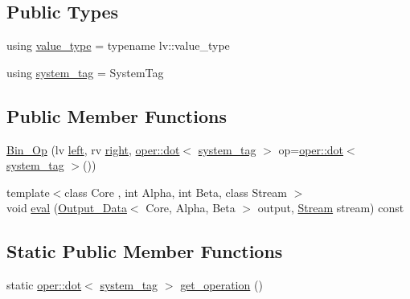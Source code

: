 \subsection*{Public Types}
\begin{DoxyCompactItemize}
\item 
using \hyperlink{structbc_1_1tensors_1_1exprs_1_1Bin__Op_3_01oper_1_1dot_3_01SystemTag_01_4_00_01lv_00_01rv_01_4_a6e196b34e6c3c318929830ed01156927}{value\+\_\+type} = typename lv\+::value\+\_\+type
\item 
using \hyperlink{structbc_1_1tensors_1_1exprs_1_1Bin__Op_3_01oper_1_1dot_3_01SystemTag_01_4_00_01lv_00_01rv_01_4_aac42309fcd782d98f3d908ce98defba8}{system\+\_\+tag} = System\+Tag
\end{DoxyCompactItemize}
\subsection*{Public Member Functions}
\begin{DoxyCompactItemize}
\item 
\hyperlink{structbc_1_1tensors_1_1exprs_1_1Bin__Op_3_01oper_1_1dot_3_01SystemTag_01_4_00_01lv_00_01rv_01_4_a9078278be7946d741f995f564ef3885e}{Bin\+\_\+\+Op} (lv \hyperlink{structbc_1_1tensors_1_1exprs_1_1Bin__Op_3_01oper_1_1dot_3_01SystemTag_01_4_00_01lv_00_01rv_01_4_a1a5f4155953dd6833d49faf2ca2d0b38}{left}, rv \hyperlink{structbc_1_1tensors_1_1exprs_1_1Bin__Op_3_01oper_1_1dot_3_01SystemTag_01_4_00_01lv_00_01rv_01_4_a9aca1e09b777dd5ca1edbbc27f59f01d}{right}, \hyperlink{structbc_1_1oper_1_1dot}{oper\+::dot}$<$ \hyperlink{structbc_1_1tensors_1_1exprs_1_1Bin__Op_3_01oper_1_1dot_3_01SystemTag_01_4_00_01lv_00_01rv_01_4_aac42309fcd782d98f3d908ce98defba8}{system\+\_\+tag} $>$ op=\hyperlink{structbc_1_1oper_1_1dot}{oper\+::dot}$<$ \hyperlink{structbc_1_1tensors_1_1exprs_1_1Bin__Op_3_01oper_1_1dot_3_01SystemTag_01_4_00_01lv_00_01rv_01_4_aac42309fcd782d98f3d908ce98defba8}{system\+\_\+tag} $>$())
\item 
{\footnotesize template$<$class Core , int Alpha, int Beta, class Stream $>$ }\\void \hyperlink{structbc_1_1tensors_1_1exprs_1_1Bin__Op_3_01oper_1_1dot_3_01SystemTag_01_4_00_01lv_00_01rv_01_4_afbee15d8347800bab6db511df9ea245b}{eval} (\hyperlink{structbc_1_1tensors_1_1exprs_1_1Output__Data}{Output\+\_\+\+Data}$<$ Core, Alpha, Beta $>$ output, \hyperlink{classbc_1_1streams_1_1Stream}{Stream} stream) const
\end{DoxyCompactItemize}
\subsection*{Static Public Member Functions}
\begin{DoxyCompactItemize}
\item 
static \hyperlink{structbc_1_1oper_1_1dot}{oper\+::dot}$<$ \hyperlink{structbc_1_1tensors_1_1exprs_1_1Bin__Op_3_01oper_1_1dot_3_01SystemTag_01_4_00_01lv_00_01rv_01_4_aac42309fcd782d98f3d908ce98defba8}{system\+\_\+tag} $>$ \hyperlink{structbc_1_1tensors_1_1exprs_1_1Bin__Op_3_01oper_1_1dot_3_01SystemTag_01_4_00_01lv_00_01rv_01_4_a75d2463548379d223cd1c3e6133f5bd2}{get\+\_\+operation} ()
\end{DoxyCompactItemize}

